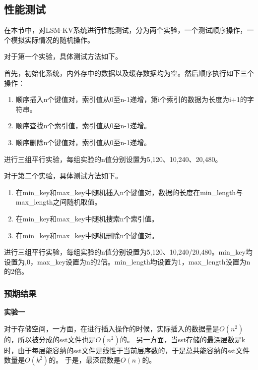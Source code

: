 \documentclass{article}
\begin{document}
\subsection{性能测试}\label{test}
在本节中，对LSM-KV系统进行性能测试，分为两个实验，一个测试顺序操作，一个模拟实际情况的随机操作。

对于第一个实验，具体测试方法如下。

首先，初始化系统，内外存中的数据以及缓存数据均为空。然后顺序执行如下三个操作：
\begin{enumerate}
	\item 顺序插入n个键值对，索引值从0至n-1递增，第i个索引的数据为长度为i+1的字符串。
	\item 顺序查找n个索引值，索引值从0至n-1递增。
	\item 顺序删除n个键值对，索引值从0至n-1递增。
\end{enumerate}
进行三组平行实验，每组实验的n值分别设置为5,120、10,240、20,480。

对于第二个实验，具体测试方法如下。
\begin{enumerate}
	\item 在min\_key和max\_key中随机插入n个键值对，数据的长度在min\_length与max\_length之间随机取值。
	\item 在min\_key和max\_key中随机搜索n个索引值。
	\item 在min\_key和max\_key中随机删除n个键值对。
\end{enumerate}
进行三组平行实验，每组实验的n值分别设置为5,120、10,240/20,480。min\_key均设置为,0，max\_key设置为n的2倍。min\_length均设置为1，max\_length设置为n的2倍。

\subsubsection{预期结果}


\textbf{实验一}

对于存储空间，一方面，在进行插入操作的时候，实际插入的数据量是$O(n^2)$的，所以被分成的sst文件也是$O(n^2)$的。
另一方面，当sst存储的最深层数是k时，由于每层能容纳的sst文件是线性于当前层序数的，于是总共能容纳的sst文件数量是$O(k^2)$的。
于是，最深层数是$O(n)$的。
\end{document}

